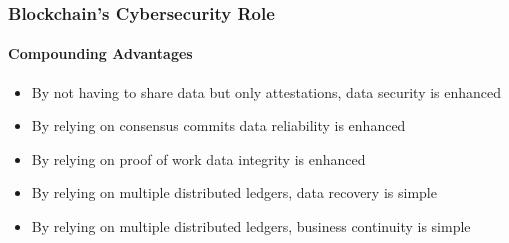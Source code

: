 \begin{frame}
  \frametitle{Blockchain's Cybersecurity Role}
  \framesubtitle{Compounding Advantages}

  \begin{itemize}
    \item By not having to share data but only attestations, data security is enhanced
    \item By relying on consensus commits data reliability is enhanced
    \item By relying on proof of work data integrity is enhanced
    \item By relying on multiple distributed ledgers, data recovery is simple
    \item By relying on multiple distributed ledgers, business continuity is simple
  \end{itemize}


\end{frame}
